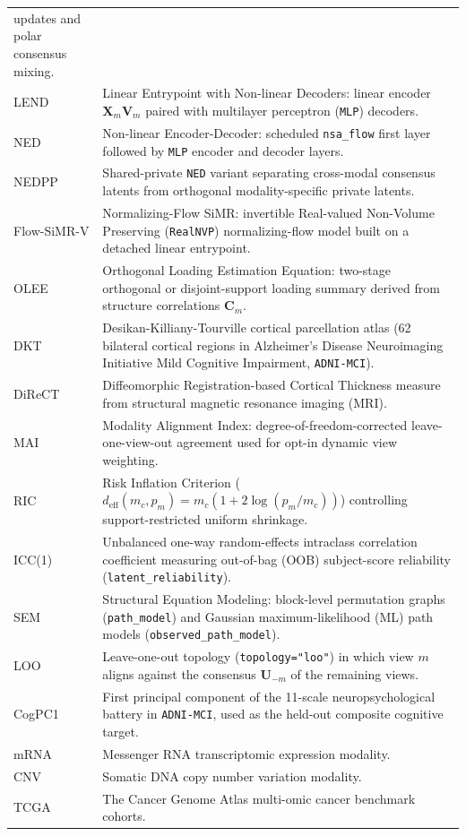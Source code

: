 \documentclass[
  10pt,
  letterpaper,
]{report}
\begin{document}
\begin{longtable}[]{@{}
  >{\raggedright\arraybackslash}p{}
  >{\raggedright\arraybackslash}p{}@{}}
updates and polar consensus mixing. \\
LEND & Linear Entrypoint with Non-linear Decoders: linear encoder
\(\mathbf{X}_m \mathbf{V}_m\) paired with multilayer perceptron
(\texttt{MLP}) decoders. \\
NED & Non-linear Encoder-Decoder: scheduled \texttt{nsa\_flow} first
layer followed by \texttt{MLP} encoder and decoder layers. \\
NEDPP & Shared-private \texttt{NED} variant separating cross-modal
consensus latents from orthogonal modality-specific private latents. \\
Flow-SiMR-V & Normalizing-Flow SiMR: invertible Real-valued Non-Volume
Preserving (\texttt{RealNVP}) normalizing-flow model built on a detached
linear entrypoint. \\
OLEE & Orthogonal Loading Estimation Equation: two-stage orthogonal or
disjoint-support loading summary derived from structure correlations
\(\mathbf{C}_m\). \\
DKT & Desikan-Killiany-Tourville cortical parcellation atlas (62
bilateral cortical regions in Alzheimer's Disease Neuroimaging
Initiative Mild Cognitive Impairment, \texttt{ADNI-MCI}). \\
DiReCT & Diffeomorphic Registration-based Cortical Thickness measure
from structural magnetic resonance imaging (MRI). \\
MAI & Modality Alignment Index: degree-of-freedom-corrected
leave-one-view-out agreement used for opt-in dynamic view weighting. \\
RIC & Risk Inflation Criterion
(\(d_{\text{eff}}(m_c, p_m) = m_c(1 + 2\log(p_m / m_c))\)) controlling
support-restricted uniform shrinkage. \\
ICC(1) & Unbalanced one-way random-effects intraclass correlation
coefficient measuring out-of-bag (OOB) subject-score reliability
(\texttt{latent\_reliability}). \\
SEM & Structural Equation Modeling: block-level permutation graphs
(\texttt{path\_model}) and Gaussian maximum-likelihood (ML) path models
(\texttt{observed\_path\_model}). \\
LOO & Leave-one-out topology (\texttt{topology="loo"}) in which view
\(m\) aligns against the consensus \(\mathbf{U}_{-m}\) of the remaining
views. \\
CogPC1 & First principal component of the 11-scale neuropsychological
battery in \texttt{ADNI-MCI}, used as the held-out composite cognitive
target. \\
mRNA & Messenger RNA transcriptomic expression modality. \\
CNV & Somatic DNA copy number variation modality. \\
TCGA & The Cancer Genome Atlas multi-omic cancer benchmark cohorts. \\
\end{longtable}
\end{document}
